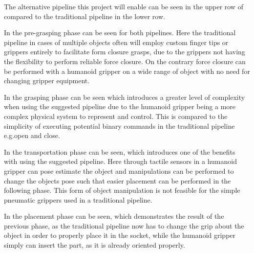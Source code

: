 The alternative pipeline this project will enable can be seen in the upper row of  compared to the traditional pipeline in the lower row.\medskip 

In  the pre-grasping phase can be seen for both pipelines. Here the traditional pipeline in cases of multiple objects often will employ custom finger tips or grippers entirely to facilitate form closure grasps, due to the grippers not having the flexibility to perform reliable force closure. On the contrary force closure can be performed with a humanoid gripper on a wide range of object with no need for changing gripper equipment. \medskip

In  the grasping phase can be seen which introduces a greater level of complexity when using the suggested pipeline due to the humanoid gripper being a more complex physical system to represent and control. This is compared to the simplicity of executing potential binary commands in the traditional pipeline e.g.open and close. \medskip

In  the transportation phase can be seen, which introduces one of the benefits with using the suggested pipeline. Here through tactile sensors in a humanoid gripper can pose estimate the object and manipulations can be performed to change the objects pose such that easier placement can be performed in the following phase. This form of object manipulation is not feasible for the simple pneumatic grippers used in a traditional pipeline. \medskip

In  the placement phase can be seen, which demonstrates the result of the previous phase, as the traditional pipeline now has to change the grip about the object in order to properly place it in the socket, while the humanoid gripper simply can insert the part, as it is already oriented properly. \medskip

\newpage


